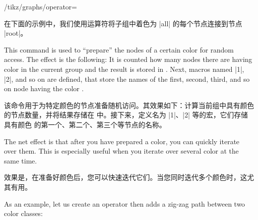 \begin{key}{/tikz/graphs/operator=}
\begin{command}{\tikzgraphforeachcolorednode{}}
        在下面的示例中，我们使用运算符将子组中着色为 |all| 的每个节点连接到节点 |root|。
%
\begin{codeexample}[preamble={\usetikzlibrary{graphs}}]
\def\myconnect#1{\tikzset{graphs/new ->={root}{#1}{}{}}}

\end{codeexample}
    \end{command}

    \begin{command}{\tikzgraphpreparecolor{}}
        This command is used to ``prepare'' the nodes of a certain color for
        random access. The effect is the following: It is counted how many
        nodes there are having color  in the current group and
        the result is stored in . Next, macros named
        |1|, |2|, and so on are defined, that store
        the names of the first, second, third, and so on node having the color
        .

        该命令用于为特定颜色的节点准备随机访问。其效果如下：计算当前组中具有颜色  的节点数量，并将结果存储在  中。接下来，定义名为 |1|、|2| 等的宏，它们存储具有颜色  的第一个、第二个、第三个等节点的名称。

        The net effect is that after you have prepared a color, you can quickly
        iterate over them. This is especially useful when you iterate over
        several color at the same time.

        效果是，在准备好颜色后，您可以快速迭代它们。当您同时迭代多个颜色时，这尤其有用。

        As an example, let us create an operator then adds a zig-zag path
        between two color classes:
        

\end{command}
\end{key}
